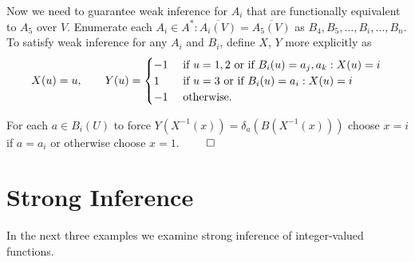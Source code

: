 \documentclass[11pt]{article}
\begin{document}
Now we need to guarantee weak inference for $ A_i $ that are functionally equivalent to $ A_5 $ over $ V $. Enumerate each $ A_i \in A^{*}: \overline{A_i(V)} = \overline{A_5(V)} $ as $ B_4, B_5, \dots, B_i, \dots, B_n $. To satisfy weak inference for any $ A_i $ and $ B_i $, define $ X $, $ Y $ more explicitly as 
\begin{equation*} 
     X(u) = u, \quad \quad
     Y(u) = \begin{cases} 
    -1 & \text{ if } u = 1, 2 \text { or if } B_i(u) = a_j, a_k: X(u) = i \\
     1 & \text{ if } u = 3 \text{ or if } B_i(u) = a_i: X(u) = i \\
    -1 & \text { otherwise. } \\
            \end{cases} \\
\end{equation*}

For each $ a \in B_i(U) $ to force $ Y(X^{-1}(x)) = \delta_{a}(B(X^{-1}(x))) $ choose $ x = i $ if $ a = a_i $ or otherwise choose $ x = 1 $. $ \hfill \qed $ \\


\newpage
\section{Strong Inference} 
 
In the next three examples we examine strong inference of integer-valued functions. \\
 
\end{document}
